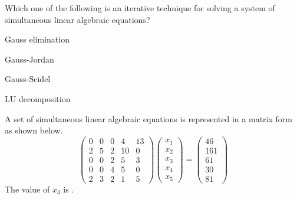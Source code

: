\item Which one of the following is an iterative technique for solving a system of simultaneous linear algebraic equations?
\hfill{}
    \begin{enumerate}
    \begin{multicols}{2}
        \item Gauss elimination
        \item Gauss-Jordan
        \item Gauss-Seidel
        \item LU decomposition
        \end{multicols}
    \end{enumerate}
\item A set of simultaneous linear algebraic equations is represented in a matrix form as shown below.
\[\begin{pmatrix}0 & 0 & 0 & 4 & 13 \\2 & 5 & 2 & 10 & 0 \\0 & 0 & 2 & 5 & 3 \\0 & 0 & 4 & 5 & 0 \\2 & 3 & 2 & 1 & 5\end{pmatrix}\begin{pmatrix}x_1 \\x_2 \\x_3 \\x_4 \\x_5\end{pmatrix}=\begin{pmatrix}46 \\161 \\61 \\30 \\81\end{pmatrix}\]
The value  of $x_3$ is \underline{\hspace{1cm}}.
\hfill{}
